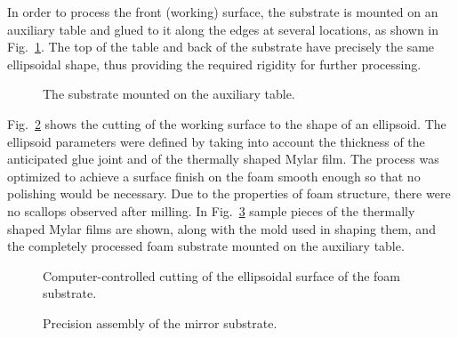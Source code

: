 In order to process the front (working) surface, the substrate is mounted 
on an auxiliary table and glued to it along the edges at several locations, 
as shown in Fig.~\ref{auxiliar}.  The top of the table and back of the 
substrate have precisely the same ellipsoidal shape, thus providing the 
required rigidity for further processing.

\begin{figure}
\begin{center}
\caption{\small{The substrate mounted on the auxiliary table.}}
\label{auxiliar}
\end{center} 
\end{figure}

Fig.~\ref{computer} shows the cutting of the working surface to the shape 
of an ellipsoid.  The ellipsoid parameters were defined by taking into
account the thickness of the anticipated glue joint and of the thermally 
shaped Mylar film.  The process was optimized to achieve a surface finish 
on the foam smooth enough so that no polishing would be necessary. Due to 
the properties of foam structure, there were no scallops observed after 
milling.  In Fig.~\ref{prototype} sample pieces of the thermally shaped 
Mylar films are shown, along with the mold used in shaping them, and the 
completely processed foam substrate mounted on the auxiliary table.

\begin{figure}
\begin{center}
\caption{\small{Computer-controlled cutting of the ellipsoidal surface of 
the foam substrate.}}
\label{computer}
\end{center} 
\end{figure}

\begin{figure}
\begin{center}
\caption{\small{Precision assembly of the mirror substrate.}}
\label{prototype}
\end{center}
\end{figure}

